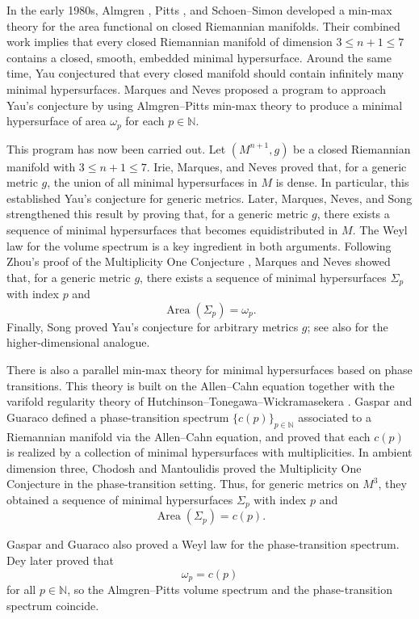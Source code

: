 \documentclass[12pt,english]{article}
\theoremstyle{definition}
\begin{document}
In the early 1980s, Almgren \cite{A}, Pitts \cite{P}, and Schoen--Simon \cite{SS} developed a min-max theory for the area functional on closed Riemannian manifolds. Their combined work implies that every closed Riemannian manifold of dimension $3\le n+1\le 7$ contains a closed, smooth, embedded minimal hypersurface. Around the same time, Yau \cite{Y} conjectured that every closed manifold should contain infinitely many minimal hypersurfaces. Marques and Neves proposed a program to approach Yau's conjecture by using Almgren--Pitts min-max theory to produce a minimal hypersurface of area $\omega_p$ for each $p\in\mathbb N$.

This program has now been carried out. Let $(M^{n+1},g)$ be a closed Riemannian manifold with $3\le n+1\le 7$. Irie, Marques, and Neves \cite{IMN} proved that, for a generic metric $g$, the union of all minimal hypersurfaces in $M$ is dense. In particular, this established Yau's conjecture for generic metrics. Later, Marques, Neves, and Song \cite{MNS} strengthened this result by proving that, for a generic metric $g$, there exists a sequence of minimal hypersurfaces that becomes equidistributed in $M$. The Weyl law for the volume spectrum is a key ingredient in both arguments. Following Zhou's proof of the Multiplicity One Conjecture \cite{Z}, Marques and Neves \cite{MN2} showed that, for a generic metric $g$, there exists a sequence of minimal hypersurfaces $\Sigma_p$ with index $p$ and
\[
\operatorname{Area}(\Sigma_p)=\omega_p.
\]
Finally, Song \cite{Song} proved Yau's conjecture for arbitrary metrics $g$; see also \cite{Li} for the higher-dimensional analogue.

There is also a parallel min-max theory for minimal hypersurfaces based on phase transitions. This theory is built on the Allen--Cahn equation together with the varifold regularity theory of Hutchinson--Tonegawa--Wickramasekera \cite{HT,TW}. Gaspar and Guaraco \cite{GG2} defined a phase-transition spectrum $\{c(p)\}_{p\in\mathbb N}$ associated to a Riemannian manifold via the Allen--Cahn equation, and proved that each $c(p)$ is realized by a collection of minimal hypersurfaces with multiplicities. In ambient dimension three, Chodosh and Mantoulidis \cite{CM} proved the Multiplicity One Conjecture in the phase-transition setting. Thus, for generic metrics on $M^3$, they obtained a sequence of minimal hypersurfaces $\Sigma_p$ with index $p$ and
\[
\operatorname{Area}(\Sigma_p)=c(p).
\]

Gaspar and Guaraco \cite{GG} also proved a Weyl law for the phase-transition spectrum. Dey \cite{Dey} later proved that
\[
\omega_p=c(p)
\]
for all $p\in\mathbb N$, so the Almgren--Pitts volume spectrum and the phase-transition spectrum coincide.
\end{document}
